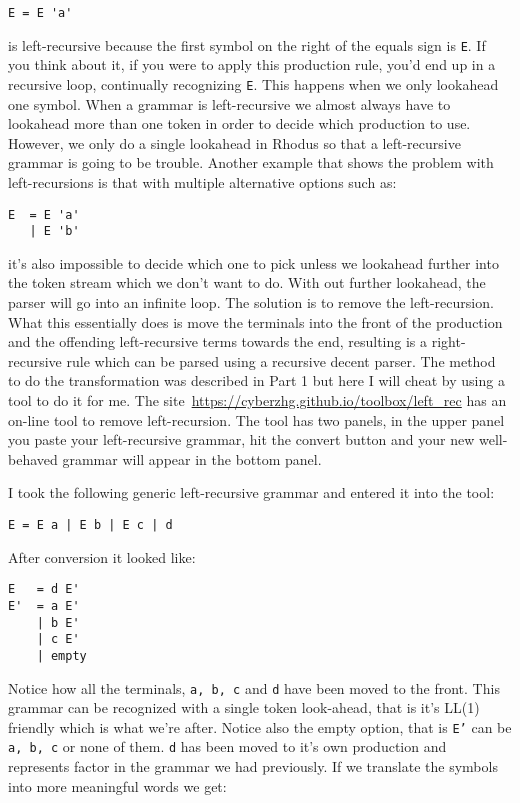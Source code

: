 {\footnotesize
\begin{verbatim}
E = E 'a'
\end{verbatim} }

is left-recursive because the first symbol on the right of the equals sign is {\tt E}. If you think about it, if you were to apply this production rule, you'd end up in a recursive loop, continually recognizing {\tt E}. This happens when we only lookahead one symbol. When a grammar is left-recursive we almost always have to lookahead more than one token in order to decide which production to use. However, we only do a single lookahead in Rhodus so that a left-recursive grammar is going to be trouble. Another example that shows the problem with left-recursions is that with multiple alternative options such as:

{\footnotesize
\begin{verbatim}
E  = E 'a'
   | E 'b'
\end{verbatim} }

it's also impossible to decide which one to pick unless we lookahead further into the token stream which we don't want to do. With out further lookahead, the parser will go into an infinite loop. The solution is to remove the left-recursion. What this essentially does is move the terminals into the front of the production and the offending left-recursive terms towards the end, resulting is a right-recursive rule which can be parsed using a recursive decent parser. The method to do the transformation was described in Part 1 but here I will cheat by using a tool to do it for me. The site~\url{https://cyberzhg.github.io/toolbox/left_rec} has an on-line tool to remove left-recursion. The tool has two panels, in the upper panel you paste your left-recursive grammar, hit the convert button and your new well-behaved grammar will appear in the bottom panel.

I took the following generic left-recursive grammar and entered it into the tool:

{\tt  E = E a | E b | E c | d}

After conversion it looked like:

{\footnotesize
\begin{verbatim}
E   = d E'
E'  = a E'
    | b E'
    | c E'
    | empty
\end{verbatim} }

Notice how all the terminals, {\tt a, b, c} and {\tt d} have been moved to the front. This grammar can be recognized with a single token look-ahead, that is it's LL(1) friendly which is what we're after. Notice also the empty option, that is {\tt E'} can be {\tt a, b, c} or none of them. {\tt d} has been moved to it's own production and represents factor in the grammar we had previously. If we translate the symbols into more meaningful words we get:

